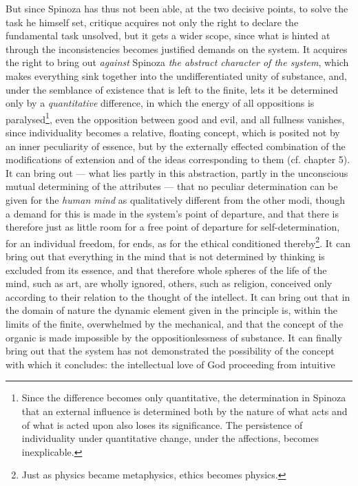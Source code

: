 \documentclass[12pt,a4paper,openany]{book}
\newcommand{\opage}[1]{\marginnote{\footnotesize\textit{[#1]}}}
\begin{document}
But since Spinoza has thus not been able, at the two decisive points,
to solve the task he himself set,
critique acquires not only the right to declare the fundamental task
unsolved, but it gets a wider scope, since what is hinted at through
the inconsistencies becomes justified demands on
the system. It acquires the right to bring out \emph{against} Spinoza
\emph{the abstract character of the system}, which makes everything
sink together into the undifferentiated unity of substance, and,
under the semblance of existence that is left to the finite, lets
it be determined only by a \emph{quantitative} difference, in which
the energy of all oppositions is paralysed\footnote{Since the difference
becomes only quantitative, the determination
in Spinoza that an external influence is determined both by the nature
of what acts and of what is acted upon also loses its significance. The persistence
of individuality under quantitative change, under
the affections, becomes inexplicable.}, even the opposition
between good and evil, and all fullness vanishes,
since individuality becomes a relative, floating concept, which
is posited not by an inner peculiarity of essence, but by
the externally effected combination of the modifications of extension
and of the ideas corresponding to them (cf. chapter 5). It can
bring out --- what lies partly in this abstraction, partly in
the unconscious mutual determining of the attributes --- that no
peculiar determination can be given for the \emph{human
mind} as qualitatively different from the other modi,
though a demand for this is made in the system's point of departure,
and that there is therefore just as little room for a free
\opage{180}\setcounter{footnote}{0}point of departure for self-determination, for an individual freedom,
for ends, as for the ethical conditioned thereby\footnote{Just as
physics became metaphysics, ethics becomes physics.}. It
can bring out that everything in the mind that is not determined by
thinking is excluded from its essence, and that therefore whole
spheres of the life of the mind, such as art, are wholly ignored,
others, such as religion, conceived only according to their relation
to the thought of the intellect. It can bring out that in the domain
of nature the dynamic element given in the principle is, within the limits
of the finite, overwhelmed by the mechanical, and that
the concept of the organic is made impossible by the oppositionlessness of substance.
It can finally bring out that the system
has not demonstrated the possibility of the concept with which
it concludes: the intellectual love of God proceeding from intuitive
\end{document}
